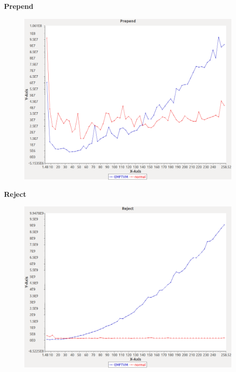 \noindent\textbf{Prepend}

\begin{figure}[h]
\centering
\includegraphics[width=\textwidth]{../graphs/orderedset/Prepend}
\end{figure}
\pagebreak

\noindent\textbf{Reject}

\begin{figure}[h]
\centering
\includegraphics[width=\textwidth]{../graphs/orderedset/Reject}
\end{figure}
\pagebreak

